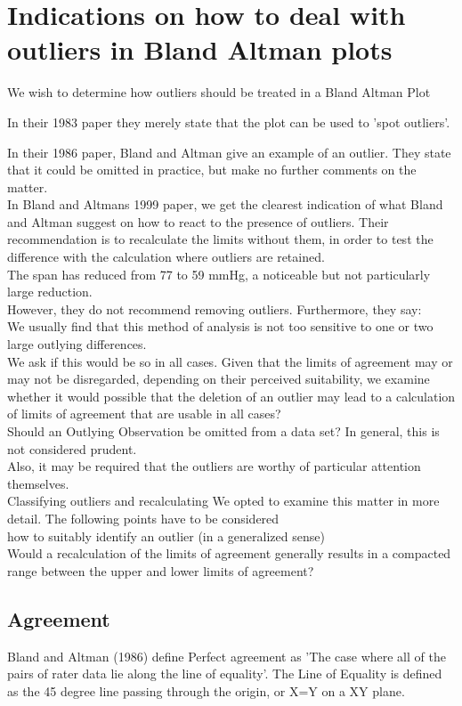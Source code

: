 \documentclass[12pt, a4paper]{report}
\theoremstyle{plain}
\theoremstyle{definition}
\theoremstyle{remark}
\begin{document}
	\section{Indications on how to deal with outliers in Bland Altman plots}

	We wish to determine how outliers should be treated in a Bland
	Altman Plot
	
	In their 1983 paper they merely state that the plot can be used to
	'spot outliers'.

	In  their 1986 paper, Bland and Altman give an example of an
	outlier. They state that it could be omitted in practice, but make
	no further comments on the matter.
	\\
	In Bland and Altmans 1999 paper, we get the clearest indication of
	what Bland and Altman suggest on how to react to the presence of
	outliers. Their recommendation is to recalculate the limits
	without them, in order to test the difference with the calculation
	where outliers are retained.\\
	
	The span has reduced from 77 to 59 mmHg, a noticeable but not
	particularly large reduction.
	\\
	However, they do not recommend removing outliers. Furthermore,
	they say:
	\\
	We usually find that this method of analysis is not too sensitive
	to one or two large outlying differences.
	\\
	We ask if this would be so in all cases. Given that the limits of
	agreement may or may not be disregarded, depending on their
	perceived suitability, we examine whether it would possible that
	the deletion of an outlier may lead to a calculation of limits of
	agreement that are usable in all cases?
	\\
	Should an Outlying Observation be omitted from a data set? In
	general, this is not considered prudent.
	\\
	Also, it may be required that the outliers are worthy of
	particular attention themselves.
	\\
	Classifying outliers and recalculating We opted to examine this
	matter in more detail. The following points have to be considered
	\\how to suitably identify an outlier (in a generalized sense)
	\\Would a recalculation of the limits of agreement generally
	results in  a compacted range between the upper and lower limits
	of agreement?
	\subsection{Agreement} Bland and Altman (1986) define Perfect
	agreement as 'The case where all of the pairs of rater data lie
	along the line of equality'. The Line of Equality is defined as
	the 45 degree line passing through the origin, or X=Y on a XY
	plane.
	
\end{document}
